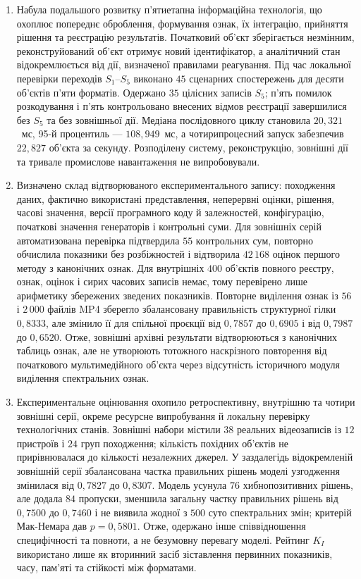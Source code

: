 \begin{enumerate}[label=\arabic*.]
\item Набула подальшого розвитку п’ятиетапна інформаційна технологія, що охоплює попереднє оброблення, формування ознак, їх інтеграцію, прийняття рішення та реєстрацію результатів. Початковий об’єкт зберігається незмінним, реконструйований об’єкт отримує новий ідентифікатор, а аналітичний стан відокремлюється від дії, визначеної правилами реагування. Під час локальної перевірки переходів $S_1$--$S_5$ виконано $45$ сценарних спостережень для десяти об’єктів п’яти форматів. Одержано $35$ цілісних записів $S_5$; п’ять помилок розкодування і п’ять контрольовано внесених відмов реєстрації завершилися без $S_5$ та без зовнішньої дії. Медіана послідовного циклу становила $20{,}321$~мс, 95-й процентиль --- $108{,}949$~мс, а чотирипроцесний запуск забезпечив $22{,}827$ об’єкта за секунду. Розподілену систему, реконструкцію, зовнішні дії та тривале промислове навантаження не випробовували.

\item Визначено склад відтворюваного експериментального запису: походження даних, фактично використані представлення, неперервні оцінки, рішення, часові значення, версії програмного коду й залежностей, конфігурацію, початкові значення генераторів і контрольні суми. Для зовнішніх серій автоматизована перевірка підтвердила $55$ контрольних сум, повторно обчислила показники без розбіжностей і відтворила $42\,168$ оцінок першого методу з канонічних ознак. Для внутрішніх $400$ об’єктів повного реєстру, ознак, оцінок і сирих часових записів немає, тому перевірено лише арифметику збережених зведених показників. Повторне виділення ознак із $56$ і $2\,000$ файлів MP4 зберегло збалансовану правильність структурної гілки $0{,}8333$, але змінило її для спільної проєкції від $0{,}7857$ до $0{,}6905$ і від $0{,}7987$ до $0{,}6520$. Отже, зовнішні архівні результати відтворюються з канонічних таблиць ознак, але не утворюють тотожного наскрізного повторення від початкового мультимедійного об’єкта через відсутність історичного модуля виділення спектральних ознак.

\item Експериментальне оцінювання охопило ретроспективну, внутрішню та чотири зовнішні серії, окреме ресурсне випробування й локальну перевірку технологічних станів. Зовнішні набори містили $38$ реальних відеозаписів із $12$ пристроїв і $24$ груп походження; кількість похідних об’єктів не прирівнювалася до кількості незалежних джерел. У заздалегідь відокремленій зовнішній серії збалансована частка правильних рішень моделі узгодження змінилася від $0{,}7827$ до $0{,}8307$. Модель усунула $76$ хибнопозитивних рішень, але додала $84$ пропуски, зменшила загальну частку правильних рішень від $0{,}7500$ до $0{,}7460$ і не виявила жодної з $500$ суто спектральних змін; критерій Мак-Немара дав $p=0{,}5801$. Отже, одержано інше співвідношення специфічності та повноти, а не безумовну перевагу моделі. Рейтинг $K_I$ використано лише як вторинний засіб зіставлення первинних показників, часу, пам’яті та стійкості між форматами.
\end{enumerate}

